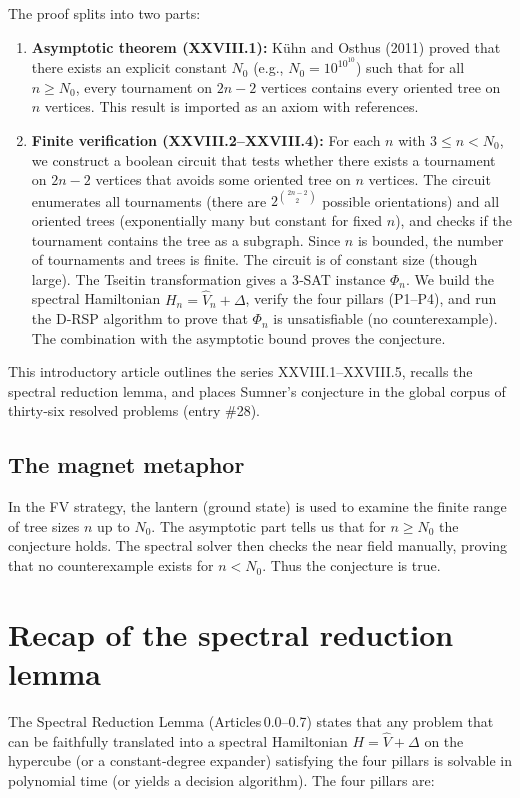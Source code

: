 \documentclass[11pt,a4paper]{article}
\begin{document}
The proof splits into two parts:
\begin{enumerate}
\item \textbf{Asymptotic theorem (XXVIII.1):} Kühn and Osthus (2011) proved that there exists an explicit constant $N_0$ (e.g., $N_0 = 10^{10^{10}}$) such that for all $n \ge N_0$, every tournament on $2n-2$ vertices contains every oriented tree on $n$ vertices. This result is imported as an axiom with references.
\item \textbf{Finite verification (XXVIII.2–XXVIII.4):} For each $n$ with $3 \le n < N_0$, we construct a boolean circuit that tests whether there exists a tournament on $2n-2$ vertices that avoids some oriented tree on $n$ vertices. The circuit enumerates all tournaments (there are $2^{\binom{2n-2}{2}}$ possible orientations) and all oriented trees (exponentially many but constant for fixed $n$), and checks if the tournament contains the tree as a subgraph. Since $n$ is bounded, the number of tournaments and trees is finite. The circuit is of constant size (though large). The Tseitin transformation gives a 3‑SAT instance $\Phi_n$. We build the spectral Hamiltonian $H_n = \hat{V}_n + \Delta$, verify the four pillars (P1–P4), and run the D‑RSP algorithm to prove that $\Phi_n$ is unsatisfiable (no counterexample). The combination with the asymptotic bound proves the conjecture.
\end{enumerate}

This introductory article outlines the series XXVIII.1–XXVIII.5, recalls the spectral reduction lemma, and places Sumner's conjecture in the global corpus of thirty‑six resolved problems (entry \#28).

\subsection*{The magnet metaphor}

In the FV strategy, the lantern (ground state) is used to examine the finite range of tree sizes $n$ up to $N_0$. The asymptotic part tells us that for $n \ge N_0$ the conjecture holds. The spectral solver then checks the near field manually, proving that no counterexample exists for $n < N_0$. Thus the conjecture is true.

\section{Recap of the spectral reduction lemma}

The Spectral Reduction Lemma (Articles 0.0–0.7) states that any problem that can be faithfully translated into a spectral Hamiltonian $H = \hat{V} + \Delta$ on the hypercube (or a constant‑degree expander) satisfying the four pillars is solvable in polynomial time (or yields a decision algorithm). The four pillars are:
\end{document}
